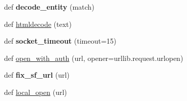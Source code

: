 \begin{DoxyCompactItemize}
def {\bfseries decode\+\_\+entity} (match)
\item 
def \hyperlink{namespacesetuptools_1_1package__index_a31f99bcf1ac5bfd133a96d93a1172078}{htmldecode} (text)
\item 
\mbox{\label{namespacesetuptools_1_1package__index_a3d3d4071a980831697f5e1495af7af16}} 
def {\bfseries socket\+\_\+timeout} (timeout=15)
\item 
def \hyperlink{namespacesetuptools_1_1package__index_a7c5c00cd960eeda8764cb89731fca84a}{open\+\_\+with\+\_\+auth} (url, opener=urllib.\+request.\+urlopen)
\item 
\mbox{\label{namespacesetuptools_1_1package__index_a54de460bc10958fb74c9773ce7411128}} 
def {\bfseries fix\+\_\+sf\+\_\+url} (url)
\item 
def \hyperlink{namespacesetuptools_1_1package__index_a54dcf838d95efdcc84ef4720d32be7a7}{local\+\_\+open} (url)
\end{DoxyCompactItemize}

